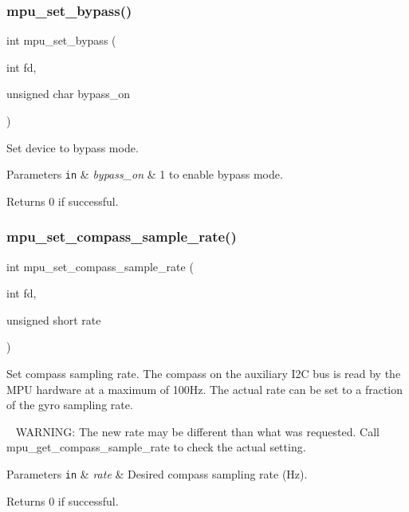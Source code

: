 \subsubsection{mpu\+\_\+set\+\_\+bypass()}
{\footnotesize\ttfamily int mpu\+\_\+set\+\_\+bypass (\begin{DoxyParamCaption}\item[{int}]{fd,  }\item[{unsigned char}]{bypass\+\_\+on }\end{DoxyParamCaption})}



Set device to bypass mode. 


\begin{DoxyParams}[1]{Parameters}
\mbox{\tt in}  & {\em bypass\+\_\+on} & 1 to enable bypass mode. \\
\hline
\end{DoxyParams}
\begin{DoxyReturn}{Returns}
0 if successful. 
\end{DoxyReturn}
\mbox{\label{group___d_r_i_v_e_r_s_ga00acd129897b99140f9238f36ee49d97}} 
\subsubsection{mpu\+\_\+set\+\_\+compass\+\_\+sample\+\_\+rate()}
{\footnotesize\ttfamily int mpu\+\_\+set\+\_\+compass\+\_\+sample\+\_\+rate (\begin{DoxyParamCaption}\item[{int}]{fd,  }\item[{unsigned short}]{rate }\end{DoxyParamCaption})}



Set compass sampling rate. The compass on the auxiliary I2C bus is read by the M\+PU hardware at a maximum of 100\+Hz. The actual rate can be set to a fraction of the gyro sampling rate. 

~\newline
 W\+A\+R\+N\+I\+NG\+: The new rate may be different than what was requested. Call mpu\+\_\+get\+\_\+compass\+\_\+sample\+\_\+rate to check the actual setting. 
\begin{DoxyParams}[1]{Parameters}
\mbox{\tt in}  & {\em rate} & Desired compass sampling rate (Hz). \\
\hline
\end{DoxyParams}
\begin{DoxyReturn}{Returns}
0 if successful. 
\end{DoxyReturn}
\mbox{\label{group___d_r_i_v_e_r_s_gae87194f372830212bd7d35dfa21854bf}} 
